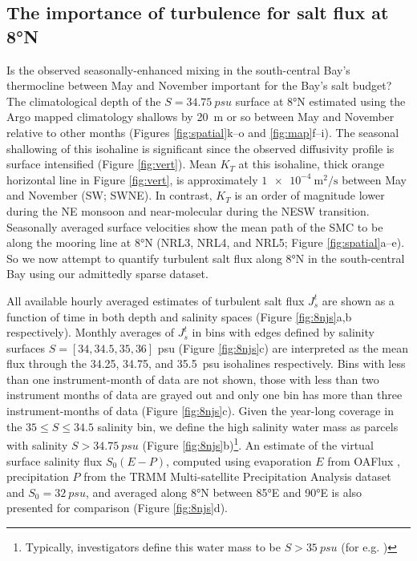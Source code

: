 \documentclass[onecol]{ametsoc}
\begin{document}
\subsection{The importance of turbulence for salt flux at 8°N}
\label{sec:js}

Is the observed seasonally-enhanced mixing in the south-central Bay's thermocline between May and November important for the Bay's salt budget?
The climatological depth of the \(S=\SI{34.75}{psu}\) surface at 8°N estimated using the Argo mapped climatology shallows by \SI{20}{m} or so between May and November relative to other months (Figures \ref{fig:spatial}k--o and \ref{fig:map}f--i).
The seasonal shallowing of this isohaline is significant since the observed diffusivity profile is surface intensified (Figure \ref{fig:vert}).
Mean $K_T$ at this isohaline, thick orange horizontal line in Figure \ref{fig:vert}, is approximately \(\SI{1e-4}{\m\squared\per\s}\) between May and November (SW; SWNE).
In contrast, $K_T$ is an order of magnitude lower during the NE monsoon and near-molecular during the NESW transition.
Seasonally averaged surface velocities show the mean path of the SMC to be along the mooring line at 8°N (NRL3, NRL4, and NRL5; Figure \ref{fig:spatial}a--e).
So we now attempt to quantify turbulent salt flux along 8°N in the south-central Bay using our admittedly sparse dataset.

All available hourly averaged estimates of turbulent salt flux \(J_s^t\) are shown as a function of time in both depth and salinity spaces (Figure \ref{fig:8njs}a,b respectively).
Monthly averages of \(J_s^t\) in bins with edges defined by salinity surfaces \(S=[34, 34.5, 35, 36]\) \si{psu} (Figure \ref{fig:8njs}c) are interpreted as the mean flux through the 34.25, 34.75, and \SI{35.5}{psu} isohalines respectively.
Bins with less than one instrument-month of data are not shown, those with less than two instrument months of data are grayed out and only one bin has more than three instrument-months of data (Figure \ref{fig:8njs}c).
Given the year-long coverage in the \(35 ≤ S ≤ 34.5\) salinity bin, we define the high salinity water mass as parcels with salinity \(S > \SI{34.75}{psu}\) (Figure \ref{fig:8njs}b)\footnote{Typically, investigators define this water mass to be \(S > \SI{35}{psu}\) (for e.g. \citealp{Vinayachandran2013})}.
An estimate of the virtual surface salinity flux \(S_0(E-P)\), computed using evaporation \(E\) from OAFlux \citep{oaflux}, precipitation \(P\) from the TRMM Multi-satellite Precipitation Analysis dataset \citep{trmm} and \(S_0 = \SI{32}{psu}\), and averaged along 8°N between 85°E and 90°E  is also presented for comparison (Figure \ref{fig:8njs}d).
\end{document}
